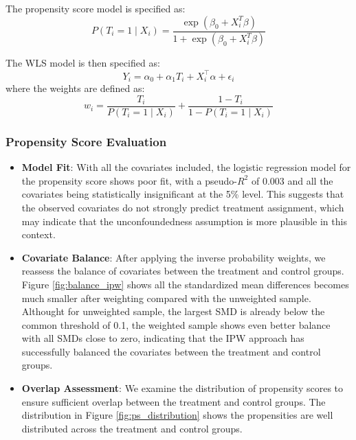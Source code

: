 \documentclass[10pt,letterpaper]{article}
\begin{document}
The propensity score model is specified as:
\begin{equation*}
P(T_i = 1 \mid X_i) = \frac{\exp(\beta_0 + X_i^T \beta)}{1 + \exp(\beta_0 + X_i^T \beta)}
\end{equation*}

The WLS model is then specified as:
\begin{equation*}
Y_i = \alpha_0 + \alpha_1 T_i + X_i^\top \alpha + \epsilon_i
\end{equation*}
where the weights are defined as:
\begin{equation*}w_i = \frac{T_i}{P(T_i = 1 \mid X_i)} + \frac{1 - T_i}{1 - P(T_i = 1 \mid X_i)}\end{equation*}

\subsubsection{Propensity Score Evaluation}
\begin{itemize}
    \item \textbf{Model Fit}: With all the covariates included, the logistic regression model for the propensity score shows poor fit, with a pseudo-$R^2$ of 0.003 and all the covariates being statistically insignificant at the 5\% level. This suggests that the observed covariates do not strongly predict treatment assignment, which may indicate that the unconfoundedness assumption is more plausible in this context.
    \item \textbf{Covariate Balance}: After applying the inverse probability weights, we reassess the balance of covariates between the treatment and control groups. Figure \ref{fig:balance_ipw} shows all the standardized mean differences becomes much smaller after weighting compared with the unweighted sample. Althought for unweighted sample, the largest SMD is already below the common threshold of 0.1, the weighted sample shows even better balance with all SMDs close to zero, indicating that the IPW approach has successfully balanced the covariates between the treatment and control groups.
    
    \item \textbf{Overlap Assessment}: We examine the distribution of propensity scores to ensure sufficient overlap between the treatment and control groups. The distribution in Figure \ref{fig:ps_distribution} shows the propensities are well distributed across the treatment and control groups.
\end{itemize}
\end{document}

